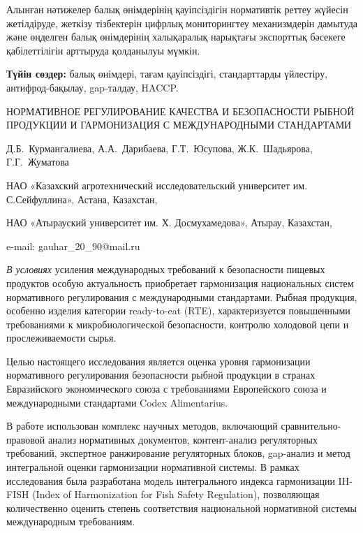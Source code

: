 Алынған нәтижелер балық өнімдерінің қауіпсіздігін нормативтік реттеу
жүйесін жетілдіруде, жеткізу тізбектерін цифрлық мониторингтеу
механизмдерін дамытуда және өңделген балық өнімдерінің халықаралық
нарықтағы экспорттық бәсекеге қабілеттілігін арттыруда қолданылуы
мүмкін.

{\bfseries Түйін сөздер:} балық өнімдері, тағам қауіпсіздігі, стандарттарды
үйлестіру, антифрод-бақылау, gap-талдау, HACCP.

\begin{header}
НОРМАТИВНОЕ РЕГУЛИРОВАНИЕ КАЧЕСТВА И БЕЗОПАСНОСТИ РЫБНОЙ ПРОДУКЦИИ И ГАРМОНИЗАЦИЯ С МЕЖДУНАРОДНЫМИ СТАНДАРТАМИ

Д.Б.~Курмангалиева,
А.А.~Дарибаева,
Г.Т.~Юсупова\envelope,
Ж.К.~Шадьярова,
Г.Г.~Жуматова
\end{header}

\begin{affil}
НАО «Казахский агротехнический исследовательский университет им. С.Сейфуллина», Астана, Казахстан,

НАО «Атырауский университет им. Х. Досмухамедова», Атырау, Казахстан,

e-mail: gauhar\_20\_90@mail.ru
\end{affil}

\emph{В условиях} усиления международных требований к безопасности
пищевых продуктов особую актуальность приобретает гармонизация
национальных систем нормативного регулирования с международными
стандартами. Рыбная продукция, особенно изделия категории ready-to-eat
(RTE), характеризуется повышенными требованиями к микробиологической
безопасности, контролю холодовой цепи и прослеживаемости сырья.

Целью настоящего исследования является оценка уровня гармонизации
нормативного регулирования безопасности рыбной продукции в странах
Евразийского экономического союза с требованиями Европейского союза и
международными стандартами Codex Alimentarius.

В работе использован комплекс научных методов, включающий
сравнительно-правовой анализ нормативных документов, контент-анализ
регуляторных требований, экспертное ранжирование регуляторных блоков,
gap-анализ и метод интегральной оценки гармонизации нормативной системы.
В рамках исследования была разработана модель интегрального индекса
гармонизации IH-FISH (Index of Harmonization for Fish Safety
Regulation), позволяющая количественно оценить степень соответствия
национальной нормативной системы международным требованиям.

